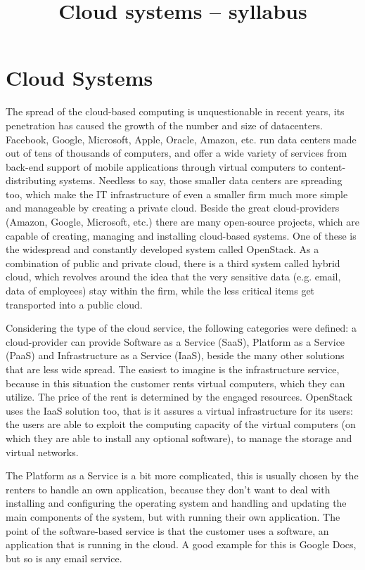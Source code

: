 \documentclass[a4paper]{article}
\title{Cloud systems – syllabus}
\author{}
\date{}
\begin{document}
\maketitle

\tableofcontents

\section{Cloud Systems}

The spread of the cloud-based computing is unquestionable in recent years, its penetration has caused the growth of the number and size of datacenters. Facebook, Google, Microsoft, Apple, Oracle, Amazon, etc. run data centers made out of tens of thousands of computers, and offer a wide variety of services from back-end support of mobile applications through virtual computers to content-distributing systems. Needless to say, those smaller data centers are spreading too, which make the IT infrastructure of even a smaller firm much more simple and manageable by creating a private cloud. Beside the great cloud-providers (Amazon, Google, Microsoft, etc.) there are many open-source projects, which are capable of creating, managing and installing cloud-based systems. One of these is the widespread and constantly developed system called OpenStack. As a combination of public and private cloud, there is a third system called hybrid cloud, which revolves around the idea that the very sensitive data (e.g. email, data of employees) stay within the firm, while the less critical items get transported into a public cloud.


Considering the type of the cloud service, the following categories were defined: a cloud-provider can provide Software as a Service (SaaS), Platform as a Service (PaaS) and Infrastructure as a Service (IaaS), beside the many other solutions that are less wide spread. The easiest to imagine is the infrastructure service, because in this situation the customer rents virtual computers, which they can utilize. The price of the rent is determined by the engaged resources. OpenStack uses the IaaS solution too, that is it assures a virtual infrastructure for its users: the users are able to exploit the computing capacity of the virtual computers (on which they are able to install any optional software), to manage the storage and virtual networks.


The Platform as a Service is a bit more complicated, this is usually chosen by the renters to handle an own application, because they don't want to deal with installing and configuring the operating system and handling and updating the main components of the system, but with running their own application. The point of the software-based service is that the customer uses a software, an application that is running in the cloud. A good example for this is Google Docs, but so is any email service.
\end{document}
